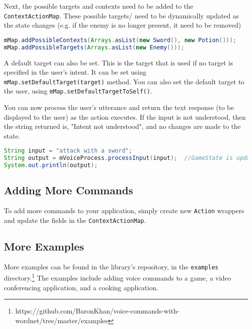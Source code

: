 \documentclass{article}
\begin{document}
Next, the possible targets and contexts need to be added to the \texttt{ContextActionMap}. These possible targets/ need to be dynamically updated as the state changes (e.g. if the enemy is no longer present, it need to be removed)

\begin{lstlisting}[language=Java, label={lst:voiceprocess-2}]
mMap.addPossibleContexts(Arrays.asList(new Sword(), new Potion()));
mMap.addPossibleTargets(Arrays.asList(new Enemy()));
\end{lstlisting}

A default target can also be set. This is the target that is used if no target is specified in the user's intent. It can be set using \texttt{mMap.setDefaultTarget(target)} method. You can also set the default target to the user, using \texttt{mMap.setDefaultTargetToSelf()}. 

You can now process the user's utterance and return the text response (to be displayed to the user) as the action executes. If the input is not understood, then the string returned is, "Intent not understood", and no changes are made to the state.

\begin{lstlisting}[language=Java, label={lst:voiceprocess-3}]
String input = "attack with a sword";
String output = mVoiceProcess.processInput(input);	//GameState is updated
System.out.println(output);
\end{lstlisting}


\subsection{Adding More Commands}

To add more commands to your application, simply create new \texttt{Action} wrappers and update the fields in the \texttt{ContextActionMap}.

\subsection{More Examples}

More examples can be found in the library's repository, in the \texttt{examples} directory.\footnote{https://github.com/BaronKhan/voice-commands-with-wordnet/tree/master/examples}  The examples include adding voice commands to a game, a video conferencing application, and a cooking application.
\end{document}
